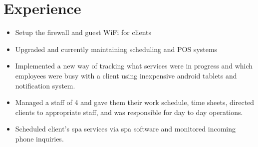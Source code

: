 \documentclass[12pt,letterpaper,sans]{moderncv}        %
\begin{document}
\section{Experience}
{\begin{itemize}%
\item Setup the firewall and guest WiFi for clients
\item Upgraded and currently maintaining scheduling and POS systems  
\item Implemented a new way of tracking what services were in progress and which employees were busy with a client using inexpensive android tablets and notification system.
\end{itemize}}  
{\begin{itemize}%
\item Managed a staff of 4 and gave them their work schedule, time sheets, directed clients to appropriate staff, and was responsible for day to day operations.
\item Scheduled client’s spa services via spa software and monitored incoming phone inquiries.
\end{itemize} }  
\end{document}
